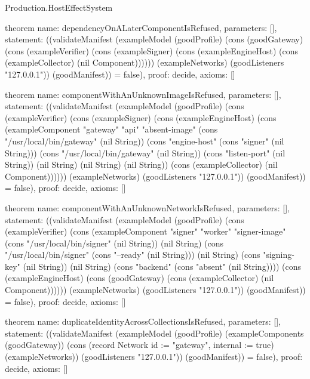 \begin{lexlean}{Production.HostEffectSystem}
\begin{semanticmodule}
theorem{
  name: dependencyOnALaterComponentIsRefused,
  parameters: [],
  statement: ((validateManifest (exampleModel (goodProfile) (cons (goodGateway) (cons (exampleVerifier) (cons (exampleSigner) (cons (exampleEngineHost) (cons (exampleCollector) (nil Component)))))) (exampleNetworks) (goodListeners "127.0.0.1")) (goodManifest)) = false),
  proof: decide{},
  axioms: []
}

theorem{
  name: componentWithAnUnknownImageIsRefused,
  parameters: [],
  statement: ((validateManifest (exampleModel (goodProfile) (cons (exampleVerifier) (cons (exampleSigner) (cons (exampleEngineHost) (cons (exampleComponent "gateway" "api" "absent-image" (cons "/usr/local/bin/gateway" (nil String)) (cons "engine-host" (cons "signer" (nil String))) (cons "/usr/local/bin/gateway" (nil String)) (cons "listen-port" (nil String)) (nil String) (nil String) (nil String)) (cons (exampleCollector) (nil Component)))))) (exampleNetworks) (goodListeners "127.0.0.1")) (goodManifest)) = false),
  proof: decide{},
  axioms: []
}

theorem{
  name: componentWithAnUnknownNetworkIsRefused,
  parameters: [],
  statement: ((validateManifest (exampleModel (goodProfile) (cons (exampleVerifier) (cons (exampleComponent "signer" "worker" "signer-image" (cons "/usr/local/bin/signer" (nil String)) (nil String) (cons "/usr/local/bin/signer" (cons "--ready" (nil String))) (nil String) (cons "signing-key" (nil String)) (nil String) (cons "backend" (cons "absent" (nil String)))) (cons (exampleEngineHost) (cons (goodGateway) (cons (exampleCollector) (nil Component)))))) (exampleNetworks) (goodListeners "127.0.0.1")) (goodManifest)) = false),
  proof: decide{},
  axioms: []
}

theorem{
  name: duplicateIdentityAcrossCollectionsIsRefused,
  parameters: [],
  statement: ((validateManifest (exampleModel (goodProfile) (exampleComponents (goodGateway)) (cons (record Network {id := "gateway", internal := true}) (exampleNetworks)) (goodListeners "127.0.0.1")) (goodManifest)) = false),
  proof: decide{},
  axioms: []
}
\end{semanticmodule}
\end{lexlean}
